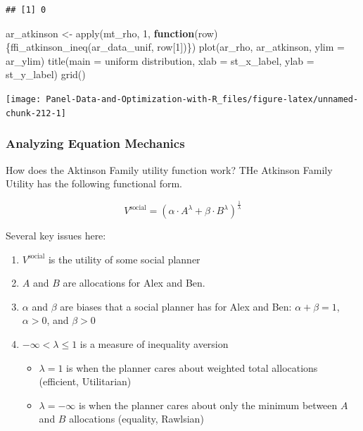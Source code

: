 \documentclass[
]{book}
\newenvironment{Shaded}{\begin{snugshade}}{\end{snugshade}}
\newcommand{\AttributeTok}[1]{\textcolor[rgb]{0.77,0.63,0.00}{#1}}
\newcommand{\ControlFlowTok}[1]{\textcolor[rgb]{0.13,0.29,0.53}{\textbf{#1}}}
\newcommand{\DecValTok}[1]{\textcolor[rgb]{0.00,0.00,0.81}{#1}}
\newcommand{\FunctionTok}[1]{\textcolor[rgb]{0.00,0.00,0.00}{#1}}
\newcommand{\NormalTok}[1]{#1}
\newcommand{\OtherTok}[1]{\textcolor[rgb]{0.56,0.35,0.01}{#1}}
\newcommand{\StringTok}[1]{\textcolor[rgb]{0.31,0.60,0.02}{#1}}
\providecommand{\tightlist}{%
  \setlength{\itemsep}{0pt}\setlength{\parskip}{0pt}}
\begin{document}
\begin{verbatim}
## [1] 0
\end{verbatim}

\begin{Shaded}
\begin{Highlighting}[]
\NormalTok{ar\_atkinson }\OtherTok{\textless{}{-}} \FunctionTok{apply}\NormalTok{(mt\_rho, }\DecValTok{1}\NormalTok{, }\ControlFlowTok{function}\NormalTok{(row)\{}\FunctionTok{ffi\_atkinson\_ineq}\NormalTok{(ar\_data\_unif, row[}\DecValTok{1}\NormalTok{])\})}
\FunctionTok{plot}\NormalTok{(ar\_rho, ar\_atkinson, }\AttributeTok{ylim =}\NormalTok{ ar\_ylim)}
\FunctionTok{title}\NormalTok{(}\AttributeTok{main =} \StringTok{\textquotesingle{}uniform distribution\textquotesingle{}}\NormalTok{, }\AttributeTok{xlab =}\NormalTok{ st\_x\_label, }\AttributeTok{ylab =}\NormalTok{ st\_y\_label)}
\FunctionTok{grid}\NormalTok{()}
\end{Highlighting}
\end{Shaded}

\begin{center}\texttt{[image: Panel-Data-and-Optimization-with-R\_files/figure-latex/unnamed-chunk-212-1]} \end{center}

\hypertarget{analyzing-equation-mechanics}{%
\subsubsection{Analyzing Equation Mechanics}\label{analyzing-equation-mechanics}}

How does the Aktinson Family utility function work? THe Atkinson Family Utility has the following functional form.

\[
V^{\text{social}}
=
\left(
\alpha
\cdot
A^{\lambda}
+
\beta
\cdot
B^{\lambda}
\right)^{\frac{1}{\lambda}}
\]

Several key issues here:

\begin{enumerate}
\def\labelenumi{\arabic{enumi}.}
\tightlist
\item
  \(V^{\text{social}}\) is the utility of some social planner
\item
  \(A\) and \(B\) are allocations for Alex and Ben.
\item
  \(\alpha\) and \(\beta\) are biases that a social planner has for Alex and Ben: \(\alpha+\beta=1\), \(\alpha>0\), and \(\beta>0\)
\item
  \(-\infty < \lambda \le 1\) is a measure of inequality aversion

  \begin{itemize}
  \tightlist
  \item
    \(\lambda=1\) is when the planner cares about weighted total allocations (efficient, Utilitarian)
  \item
    \(\lambda=-\infty\) is when the planner cares about only the minimum between \(A\) and \(B\) allocations (equality, Rawlsian)
  \end{itemize}
\end{enumerate}
\end{document}
